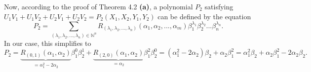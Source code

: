 \documentclass[numbers=enddot,12pt,final,onecolumn,notitlepage]{scrartcl}%
\begin{document}
Now, according to the proof of Theorem 4.2 \textbf{(a)}, a polynomial $P_{2}$
satisfying $U_{1}V_{1}+U_{1}V_{2}+U_{2}V_{1}+U_{2}V_{2}=P_{2}\left(
X_{1},X_{2},Y_{1},Y_{2}\right)  $ can be defined by the equation%
\[
P_{2}=\sum_{\left(  \lambda_{1},\lambda_{2},...,\lambda_{n}\right)
\in\mathbb{N}^{n}}R_{\left(  \lambda_{1},\lambda_{2},...,\lambda_{n}\right)
}\left(  \alpha_{1},\alpha_{2},...,\alpha_{m}\right)  \beta_{1}^{\lambda_{1}%
}\beta_{2}^{\lambda_{2}}...\beta_{n}^{\lambda_{n}}.
\]
In our case, this simplifies to%
\[
P_{2}=\underbrace{R_{\left(  0,1\right)  }\left(  \alpha_{1},\alpha
_{2}\right)  }_{=\alpha_{1}^{2}-2\alpha_{2}}\beta_{1}^{0}\beta_{2}%
^{1}+\underbrace{R_{\left(  2,0\right)  }\left(  \alpha_{1},\alpha_{2}\right)
}_{=\alpha_{2}}\beta_{1}^{2}\beta_{2}^{0}=\left(  \alpha_{1}^{2}-2\alpha
_{2}\right)  \beta_{2}+\alpha_{2}\beta_{1}^{2}=\alpha_{1}^{2}\beta_{2}%
+\alpha_{2}\beta_{1}^{2}-2\alpha_{2}\beta_{2}.
\]
\end{document}
